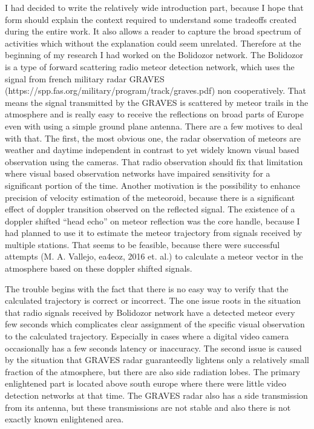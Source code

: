 I had decided to write the relatively wide introduction part, because I hope that form should explain the context required to understand some tradeoffs created during the entire work. It also allows a reader to capture the broad spectrum of activities which without the explanation could seem unrelated. 
Therefore at the beginning of my research I had worked on the Bolidozor network. The Bolidozor is a type of forward scattering radio meteor detection network, which uses the signal from french military radar GRAVES (https://spp.fas.org/military/program/track/graves.pdf) non cooperatively.  That means the signal transmitted by the GRAVES is scattered by meteor trails in the atmosphere and is really easy to receive the reflections on broad parts of Europe even with using a simple ground plane antenna.  
There are a few motives to deal with that. The first, the most obvious one, the radar observation of  meteors are weather and daytime independent in contrast to yet widely known visual based observation using the cameras. That radio observation should fix that limitation where visual based observation networks have impaired sensitivity for a significant portion of the time. Another motivation is the possibility to enhance precision of velocity estimation of the meteoroid, because there is a significant effect of doppler transition observed on the reflected signal. 
The existence of a doppler shifted “head echo” on meteor reflection was the core handle, because I had planned to use it to estimate the meteor trajectory from signals received by multiple stations.  That seems to be feasible, because there were successful attempts (M. A. Vallejo, ea4eoz, 2016 et. al.) to calculate a meteor vector in the atmosphere based on these doppler shifted signals. 


The trouble begins with the fact that there is no easy way to verify that the calculated trajectory is correct or incorrect. 
The one issue roots in the situation that radio signals received by Bolidozor network have a detected meteor every few seconds which complicates clear assignment of the specific visual observation to the calculated trajectory. Especially in cases where a digital video camera occasionally has a few seconds latency or inaccuracy. The second issue is caused by the situation that  GRAVES radar guaranteedly lightens only a relatively small fraction of the atmosphere, but there are also side radiation lobes. The primary enlightened part is located above south europe where there were little video detection networks at that time. 
The GRAVES radar also has a side transmission from its antenna, but these transmissions are not stable and also there is not exactly known enlightened area. 

